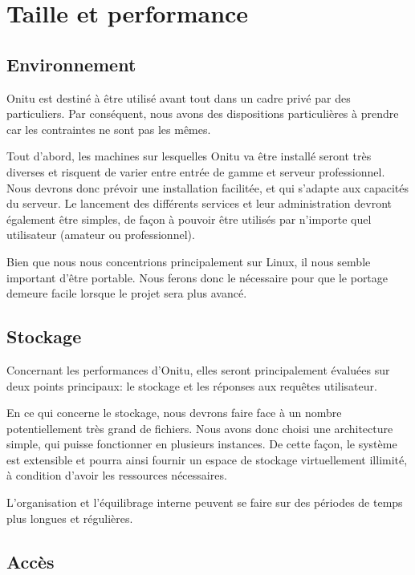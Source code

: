 \chapter{Taille et performance}
\thispagestyle{EIP} %

\section{Environnement}

Onitu est destiné à être utilisé avant tout dans un cadre privé par des particuliers. Par conséquent, nous avons des dispositions particulières à prendre car les contraintes ne sont pas les mêmes.

Tout d'abord, les machines sur lesquelles Onitu va être installé seront très diverses et risquent de varier entre entrée de gamme et serveur professionnel. Nous devrons donc prévoir une installation facilitée, et qui s'adapte aux capacités du serveur. Le lancement des différents services et leur administration devront également être simples, de façon à pouvoir être utilisés par n'importe quel utilisateur (amateur ou professionnel).

Bien que nous nous concentrions principalement sur Linux, il nous semble important d'être portable. Nous ferons donc le nécessaire pour que le portage demeure facile lorsque le projet sera plus avancé.

\section{Stockage}

Concernant les performances d'Onitu, elles seront principalement évaluées sur deux points principaux: le stockage et les réponses aux requêtes utilisateur.

En ce qui concerne le stockage, nous devrons faire face à un nombre potentiellement très grand de fichiers. Nous avons donc choisi une architecture simple, qui puisse fonctionner en plusieurs instances. De cette façon, le système est extensible et pourra ainsi fournir un espace de stockage virtuellement illimité, à condition d'avoir les ressources nécessaires.

L'organisation et l'équilibrage interne peuvent se faire sur des périodes de temps plus longues et régulières.

\section{Accès}


